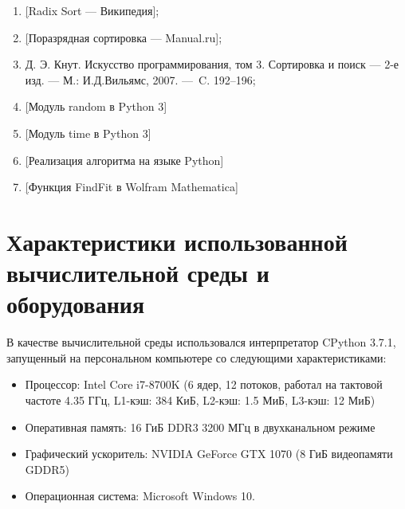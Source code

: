 \documentclass[a4paper]{article}
\begin{document}
\begin{enumerate}
	\item \href{https://en.wikipedia.org/wiki/Radix_sort}[Radix Sort — Википедия];
	\item \href{http://algolist.manual.ru/sort/radix_sort.php}[Поразрядная сортировка — Manual.ru];
	\item Д. Э. Кнут. Искусство программирования, том 3. Сортировка и поиск — 2-е изд. — М.: И.Д.Вильямс, 2007. — C. 192–196;
	\item \href{https://docs.python.org/3/library/random.html}[Модуль random в Python 3]
	\item \href{https://docs.python.org/3/library/time.html}[Модуль time в Python 3]
	\item \href{http://www.rosettacode.org/wiki/Sorting_algorithms/Radix_sort#Python}[Реализация алгоритма на языке Python]
	\item \href{https://reference.wolfram.com/language/ref/FindFit.html}[Функция FindFit в Wolfram Mathematica]
\end{enumerate}

\section{Характеристики использованной вычислительной среды и оборудования}
В качестве вычислительной среды использовался интерпретатор CPython 3.7.1, запущенный на персональном компьютере со следующими характеристиками:
\begin{itemize}
	\item Процессор: Intel Core i7-8700K (6 ядер, 12 потоков, работал на тактовой частоте 4.35 ГГц, L1-кэш: 384 КиБ, L2-кэш: 1.5 МиБ, L3-кэш: 12 МиБ)
	\item Оперативная память: 16 ГиБ DDR3 3200 МГц в двухканальном режиме
	\item Графический ускоритель: NVIDIA GeForce GTX 1070 (8 ГиБ видеопамяти GDDR5)
	\item Операционная система: Microsoft Windows 10.
\end{itemize}
\end{document}
